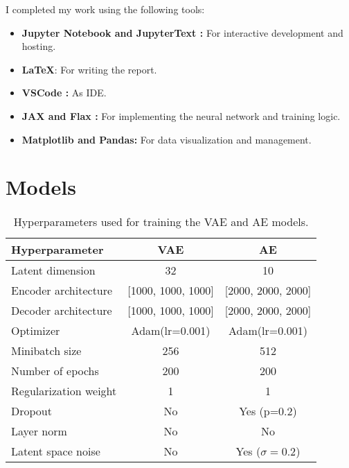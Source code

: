 \documentclass[conference,a4paper]{IEEEtran}
\begin{document}
I completed my work using the following tools:
\begin{itemize}
    \item \textbf{Jupyter Notebook \cite{Kluyver2016jupyter} and JupyterText \cite{woutsMwoutsJupytext2025}:} For interactive development and hosting.
    \item \textbf{\LaTeX}: For writing the report.
    \item \textbf{VSCode \cite{MicrosoftVscode2025}:} As IDE.
    \item \textbf{JAX \cite{jax2018github} and Flax \cite{flax2020github}:} For implementing the neural network and training logic.
    \item \textbf{Matplotlib\cite{Hunter:2007} and Pandas\cite{thepandasdevelopmentteamPandasdevPandasPandas}:} For data visualization and management.
\end{itemize}





\appendix

\section{Models}

\begin{table}[htbp]
\caption{Hyperparameters used for training the VAE and AE models.}
\label{tab:hyperparams}
\centering
\begin{tabular}{l|c|c}
\toprule
\textbf{Hyperparameter} & \textbf{VAE} & \textbf{AE} \\
\midrule
Latent dimension & 32 & 10 \\
Encoder architecture & [1000, 1000, 1000] & [2000, 2000, 2000] \\
Decoder architecture & [1000, 1000, 1000] & [2000, 2000, 2000] \\
Optimizer & Adam(lr=0.001) & Adam(lr=0.001) \\
Minibatch size & 256 & 512 \\
Number of epochs & 200 & 200 \\
Regularization weight & 1 & 1 \\
Dropout & No & Yes (p=0.2) \\
Layer norm & No & No \\
Latent space noise & No & Yes ($\sigma=0.2$) \\
\bottomrule
\end{tabular}
\end{table}
\end{document}
